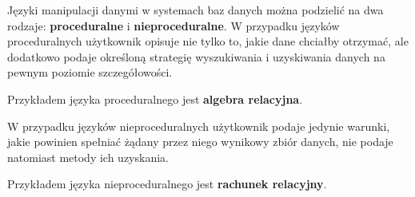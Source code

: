 Języki manipulacji danymi w systemach baz danych można podzielić na dwa rodzaje: \textbf{proceduralne} i \textbf{nieproceduralne}.
W przypadku języków proceduralnych użytkownik opisuje nie tylko to, jakie dane chciałby otrzymać, ale dodatkowo podaje określoną strategię wyszukiwania
i uzyskiwania danych na pewnym poziomie szczegółowości.

Przykładem języka proceduralnego jest \textbf{algebra relacyjna}.

W przypadku języków nieproceduralnych użytkownik podaje jedynie warunki, jakie powinien spełniać żądany przez niego wynikowy zbiór danych, nie podaje natomiast metody ich uzyskania.

Przykładem języka nieproceduralnego jest \textbf{rachunek relacyjny}.